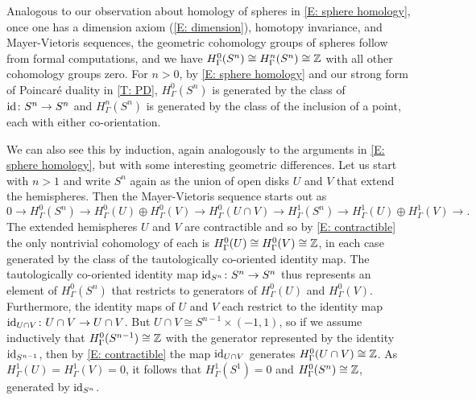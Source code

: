 \begin{example}\label{E: cohomology of spheres}
Analogous to our observation about homology of spheres in \cref{E: sphere homology}, once one has a dimension axiom (\cref{E: dimension}), homotopy invariance, and Mayer-Vietoris sequences, the geometric cohomology groups of spheres follow from formal computations, and we have $H^0_{\Gamma}(S^n)\cong H^n_\Gamma(S^n)\cong \mathbb{Z}$ with all other cohomology groups zero.
For $n>0$, by \cref{E: sphere homology} and our strong form of Poincar\'e duality in \cref{T: PD}, $H^0_{\Gamma}(S^n)$ is generated by the class of $\mathrm{id} \colon S^n \to S^n$ and $H^n_{\Gamma}(S^n)$ is generated by the class of the inclusion of a point, each with either co-orientation.

We can also see this by induction, again analogously to the arguments in \cref{E: sphere homology}, but with some interesting geometric differences. Let us start with $n>1$ and write $S^n$ again as the union of open disks $U$ and $V$ that extend the hemispheres. Then the Mayer-Vietoris sequence starts out as
\begin{equation*}
0\to H^0_\Gamma(S^n) \to H^0_\Gamma(U) \oplus H^0_\Gamma(V) \to H^0_\Gamma(U\cap V) \to H^1_\Gamma(S^n) \to H^1_\Gamma(U) \oplus H^1_\Gamma(V) \to.
\end{equation*}
The extended hemispheres $U$ and $V$ are contractible and so by \cref{E: contractible} the only nontrivial cohomology of each is $H^0_\Gamma(U) \cong H^0_\Gamma(V) \cong \mathbb{Z}$, in each case generated by the class of the tautologically co-oriented identity map.
The tautologically co-oriented identity map $\mathrm{id}_{S^n} \colon S^n \to S^n$ thus represents an element of $H^0_\Gamma(S^n)$ that restricts to generators of $H^0_\Gamma(U)$ and $H^0_\Gamma(V)$.
Furthermore, the identity maps of $U$ and $V$ each restrict to the identity map $\mathrm{id}_{U \cap V} \colon U \cap V \to U \cap V$.
But $U \cap V \cong S^{n-1} \times (-1,1)$, so if we assume inductively that $H^0_\Gamma(S^{n-1}) \cong \mathbb{Z}$ with the generator represented by the identity $\mathrm{id}_{S^{n-1}}$, then by \cref{E: contractible} the map $\mathrm{id}_{U \cap V}$ generates $H^0_\Gamma(U \cap V) \cong \mathbb{Z}$.
As $H^1_\Gamma(U) = H^1_\Gamma(V) = 0$, it follows that $H^1_\Gamma(S^1) = 0$ and $H^0_\Gamma(S^n) \cong \mathbb{Z}$, generated by $\mathrm{id}_{S^n}$.


\end{example}

